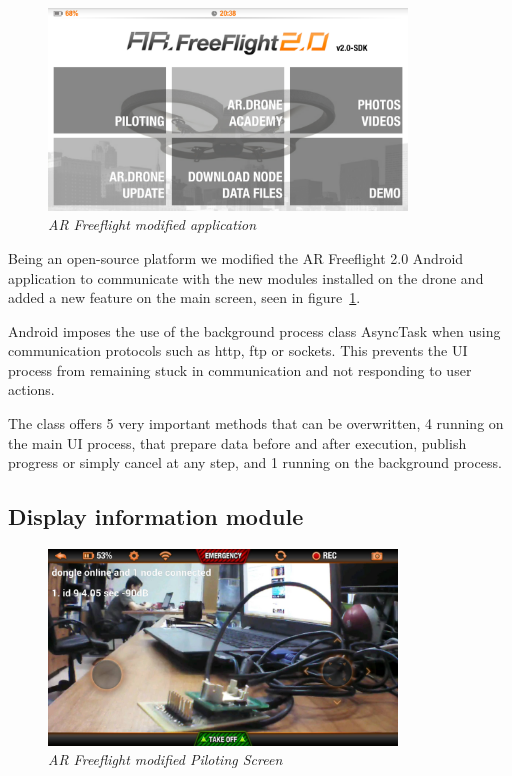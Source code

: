 \begin{figure}[ht]
\begin{center}
\includegraphics[width=0.85\textwidth]{img/android_app.png}
\end{center}
\caption{\small \itshape{AR Freeflight modified application}}
  \label{fig:moded_app}
\end{figure}

Being an open-source platform we modified the AR Freeflight 2.0 Android application to communicate with the new modules installed on the drone and added a new feature on the main screen, seen in figure~\ref{fig:moded_app}.

Android imposes the use of the background process class AsyncTask when using communication protocols such as http, ftp or sockets. This prevents the UI process from remaining stuck in communication and not responding to user actions.

The class offers 5 very important methods that can be overwritten, 4 running on the main UI process, that prepare data before and after execution, publish progress or simply cancel at any step, and 1 running on the background process.

\subsection{Display information module}

\begin{figure}[ht]
\begin{center}
\includegraphics[width=0.825\textwidth]{img/android_info.png}
\end{center}
\caption{\small \itshape{AR Freeflight modified Piloting Screen}}
  \label{fig:pilot}
\end{figure}

